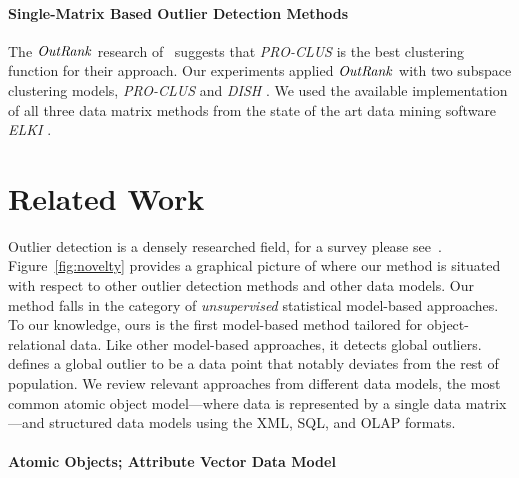 \documentclass[conference]{IEEEtran}
\begin{document}
\paragraph{Single-Matrix Based Outlier Detection Methods} 
The $\it{OutRank}$ research of~\cite{Muller2012} suggests that \textit{PRO-CLUS} is the best clustering function for their approach. Our experiments applied $\it{OutRank}$ with two subspace clustering models, \textit{PRO-CLUS} \cite{Muller2012} and \textit{DISH} \cite{Kriegel2007}.  
						We used the available implementation of all three data matrix methods from the state of the art data mining software \textit{ELKI} \cite{Elke2013}.
								

\section{Related Work}




Outlier detection is a densely researched field, for a survey please see~\cite{aggarwal2013}.
Figure~\ref{fig:novelty} provides a graphical picture of where our method is situated with respect to other outlier detection methods and other data models. 
Our method falls in the category of {\em unsupervised} statistical model-based approaches. To our knowledge, ours is the first model-based method tailored for object-relational data. Like other model-based approaches, it detects global outliers. \cite{aggarwal2013} defines a global outlier to be a data point that notably deviates from the rest of population. We review relevant approaches from different data models, the most common atomic object model---where data is represented by a single data matrix---and structured data models using the XML, SQL, and OLAP formats.
\paragraph{Atomic Objects; Attribute Vector Data Model}
\end{document}
